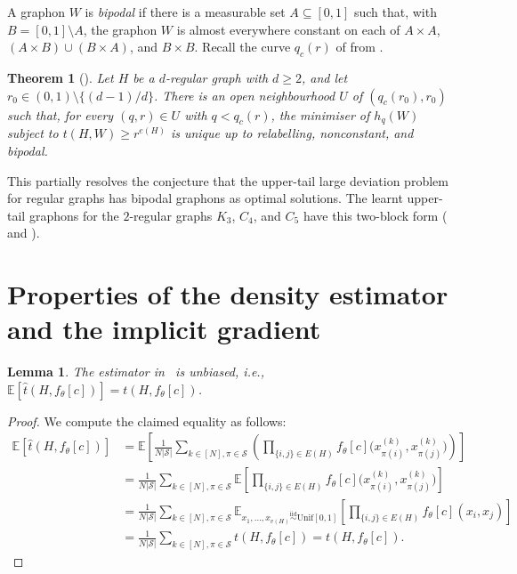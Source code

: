 \documentclass{article}
\theoremstyle{plain}
\newtheorem{theorem}{Theorem}[section]
\newtheorem{lemma}{Lemma}[section]
\theoremstyle{definition}
\theoremstyle{remark}
\begin{document}
A graphon $W$ is \emph{bipodal} if there is a measurable set $A \subseteq [0,1]$ such that, with $B = [0,1] \setminus A$, the graphon $W$ is almost everywhere constant on each of $A \times A$, $(A \times B) \cup (B \times A)$, and $B \times B$. Recall the curve $q_c(r)$ of \citet{lubetzky2015replica} from .
\begin{theorem}[{\citealp[Theorem~1.5]{lim2026bipodal}}]\label{thm:bipodal}
Let $H$ be a $d$-regular graph with $d \ge 2$, and let $r_0 \in (0,1) \setminus \{(d-1)/d\}$. There is an open neighbourhood $U$ of $(q_c(r_0), r_0)$ such that, for every $(q, r) \in U$ with $q < q_c(r)$, the minimiser of $h_q(W)$ subject to $t(H, W) \ge r^{e(H)}$ is unique up to relabelling, nonconstant, and bipodal.
\end{theorem}
This partially resolves the conjecture that the upper-tail large deviation problem for regular graphs has bipodal graphons as optimal solutions. The learnt upper-tail graphons for the $2$-regular graphs $K_3$, $C_4$, and $C_5$ have this two-block form ( and ).

\section{Properties of the density estimator and the implicit gradient}

\begin{lemma} \label{lem:unbiased}
The estimator in~ is unbiased, i.e., $\mathbb{E}[\widehat{t}(H,f_\theta[c])] = t(H,f_\theta[c])$.
\end{lemma}
\begin{proof}[Proof]
We compute the claimed equality as follows:
\begin{align*}
\mathbb{E}\left[\widehat{t}(H, f_\theta{[c]})\right] 
& {} = 
\mathbb{E}\left[\frac{1}{N|\mathcal{S}|} \sum_{k \in [N], \pi \in \mathcal{S}} \left(\prod_{\{i, j\} \in E(H)} f_\theta[c]\Big(x_{\pi(i)}^{(k)}, x_{\pi(j)}^{(k)}\Big)\right)\right]
\\
& {} = 
\frac{1}{N|\mathcal{S}|} \sum_{k \in [N], \pi \in \mathcal{S}} 
\mathbb{E}\left[\prod_{\{i, j\} \in E(H)} f_\theta[c]\Big(x_{\pi(i)}^{(k)}, x_{\pi(j)}^{(k)}\Big)\right]
\\
& {} = 
\frac{1}{N|\mathcal{S}|} \sum_{k \in [N], \pi \in \mathcal{S}} 
\mathbb{E}_{x_1,\ldots,x_{v(H)} \stackrel{\mathrm{iid}}{\sim}\mathrm{Unif}[0,1]}\left[\prod_{\{i, j\} \in E(H)} f_\theta[c](x_i, x_j)\right]
\\
& {} = 
\frac{1}{N{|\mathcal{S}|}} 
\sum_{k \in [N], \pi \in \mathcal{S}} t(H,f_\theta{[c]}) = t(H,f_\theta{[c]}).
\end{align*}
\end{proof}
\end{document}

